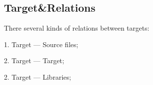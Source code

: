 \documentclass[11pt]{article}
\begin{document}
\subsection{Target\&Relations}%
\label{sub:target&relations}

There several kinds of relations between targets: 

1. Target  --- Source files;

2. Target --- Target;

2. Target --- Libraries;





\end{document}
